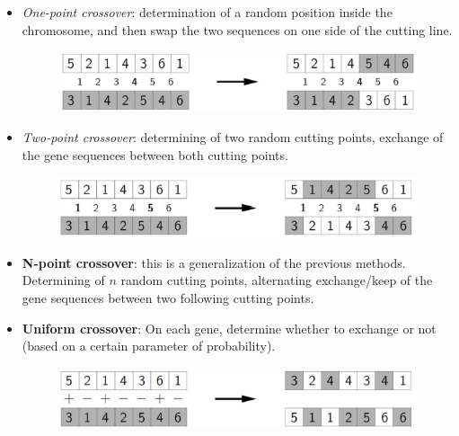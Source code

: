 \documentclass{article}
\begin{document}
\begin{itemize}
    \item \textit{One-point crossover}: determination of a random position inside
          the chromosome, and then swap the two sequences on one side of the cutting line.
          \begin{figure}[H]
              \centering
              \includegraphics[scale=0.5]{images/1pcrossover.png}
          \end{figure}

    \item \textit{Two-point crossover}: determining of two random cutting points,
          exchange of the gene sequences between both cutting points.
          \begin{figure}[H]
              \centering
              \includegraphics[scale=0.5]{images/2pcrossover.png}
          \end{figure}
    \item \textbf{N-point crossover}: this is a generalization of the previous
          methods. Determining of $n$ random cutting points, alternating exchange/keep of
          the gene sequences between two following cutting points.

    \item \textbf{Uniform crossover}: On each gene, determine whether to exchange
          or not (based on a certain parameter of probability).
          \begin{figure}[H]
              \centering
              \includegraphics[scale=0.5]{images/ucrossover.png}
          \end{figure}


\end{itemize}
\end{document}
